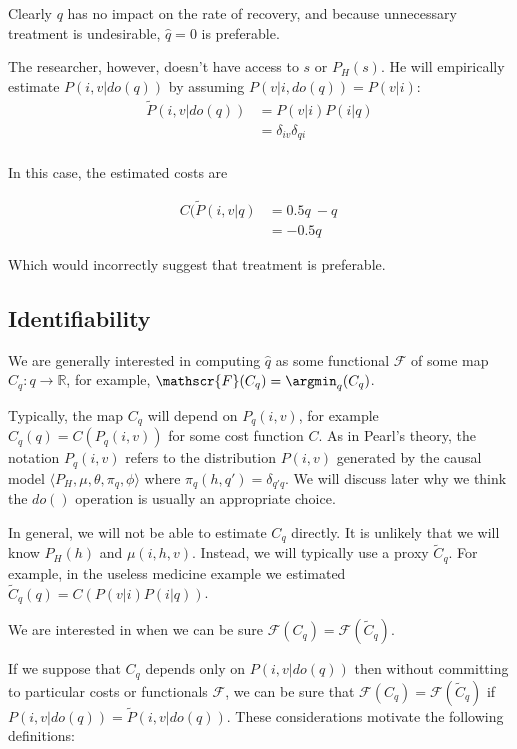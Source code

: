 Clearly $q$ has no impact on the rate of recovery, and because unnecessary treatment is undesirable, $\hat{q}=0$ is preferable.

The researcher, however, doesn't have access to $s$ or $P_H(s)$. He will empirically estimate $P(i,v|do(q))$ by assuming $P(v|i,do(q)) = P(v|i)$:
\begin{align}
    \tilde{P}(i,v|do(q)) &= P(v|i) P(i|q) \\
                         &= \delta_{iv} \delta_{qi} \\
\end{align}

In this case, the estimated costs are

\begin{align}
    C(\tilde{P}(i,v|q) &= 0.5q\ - q\ \\
                        &= - 0.5q\
\end{align}

Which would incorrectly suggest that treatment is preferable.

\subsection{Identifiability}

We are generally interested in computing $\hat{q}$ as some functional $\mathscr{F}$ of some map $C_q:q \to \mathbb{R}$, for example, $\mathscr{F}(C_q)=\argmin_q (C_q)$. 

Typically, the map $C_q$ will depend on $P_q(i,v)$, for example $C_q(q) = C(P_q(i,v))$ for some cost function $C$. As in Pearl's theory, the notation $P_q(i,v)$ refers to the distribution $P(i,v)$ generated by the causal model $\langle P_H, \mu, \theta, \pi_q, \phi\rangle$ where $\pi_q(h,q') = \delta_{q'q}$. We will discuss later why we think the $do()$ operation is usually an appropriate choice.

In general, we will not be able to estimate $C_q$ directly. It is unlikely that we will know $P_H(h)$ and $\mu(i,h,v)$. Instead, we will typically use a proxy $\tilde{C}_q$. For example, in the useless medicine example we estimated $\tilde{C}_q(q) = C(P(v|i)P(i|q))$.

We are interested in when we can be sure $\mathscr{F}(C_q) = \mathscr{F}(\tilde{C}_q)$.

If we suppose that $C_q$ depends only on $P(i,v|do(q))$ then without committing to particular costs or functionals $\mathscr{F}$, we can be sure that $\mathscr{F}(C_q) = \mathscr{F}(\tilde{C}_q)$ if $P(i,v|do(q))=\tilde{P}(i,v|do(q))$. These considerations motivate the following definitions:

